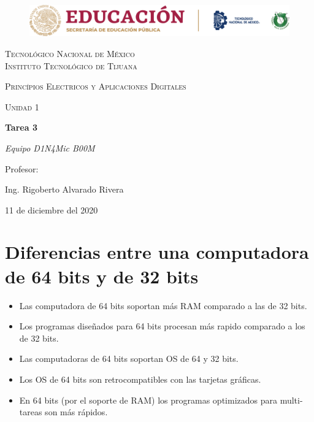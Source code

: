 \documentclass[letterpaper, 12pt]{article}
\begin{document}
    
    \begin{titlepage}
        \begin{figure}[ht]
            \centering
            \includegraphics[width=15cm]{logosITT.png}
        \end{figure}
        \centering
        {\scshape\LARGE Tecnológico Nacional de México\\Instituto Tecnológico de Tijuana\par}
        \vspace{1cm}
        {\scshape\Large Princípios Electricos y Aplicaciones Digitales\par}
        \vspace{1cm}
        {\scshape\Large Unidad 1\par}
        \vspace{1.5cm}
        {\huge\bfseries Tarea 3\par}
        \vspace{2cm}
        {\Large\itshape Equipo D1N4Mic B00M\par}
        \vfill
        Profesor: \par
        Ing. Rigoberto Alvarado Rivera
        
        \vfill

        {\large 11 de diciembre del 2020}
    \end{titlepage}

    \newpage
    \thispagestyle{empty}
    \tableofcontents
    \listoffigures

    \newpage
    \setcounter{page}{1}
    \thispagestyle{fancy}
    \section{Diferencias entre una computadora de 64 bits y de 32 bits}
    \begin{itemize}
        \item Las computadora de 64 bits soportan más RAM comparado a las de 32 bits.
        \item Los programas diseñados para 64 bits procesan más rapido comparado a los de 32 bits.
        \item Las computadoras de 64 bits soportan OS de 64 y 32 bits.
        \item Los OS de 64 bits son retrocompatibles con las tarjetas gráficas.
        \item En 64 bits (por el soporte de RAM) los programas optimizados para multi-tareas son más rápidos.
    \end{itemize}
\end{document}
